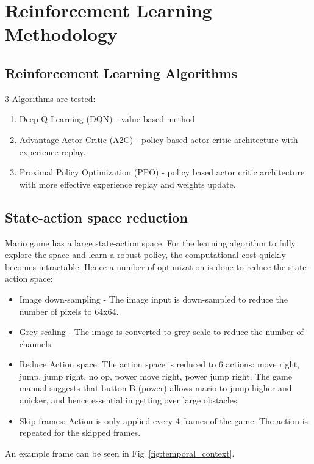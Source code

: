 \documentclass[conference]{IEEEtran}
\begin{document}
\section{Reinforcement Learning Methodology}

\subsection{Reinforcement Learning Algorithms}

3 Algorithms are tested:

\begin{enumerate}
    \item Deep Q-Learning (DQN) - value based method
    \item Advantage Actor Critic (A2C) - policy based actor critic architecture with experience replay.
    \item Proximal Policy Optimization (PPO) - policy based actor critic architecture with more effective experience replay and weights update.
\end{enumerate}

\subsection{State-action space reduction}

Mario game has a large state-action space. For the learning algorithm to fully explore the space and learn a robust policy, the computational cost quickly becomes intractable. Hence a number of optimization is done to reduce the state-action space:

\begin{itemize}
    \item Image down-sampling - The image input is down-sampled to reduce the number of pixels to 64x64.
    \item Grey scaling - The image is converted to grey scale to reduce the number of channels.
    \item Reduce Action space: The action space is reduced to 6 actions: move right, jump, jump right, no op, power move right, power jump right. The game manual suggests that button B (power) allows mario to jump higher and quicker, and hence essential in getting over large obstacles.
    \item Skip frames: Action is only applied every 4 frames of the game. The action is repeated for the skipped frames.
\end{itemize}

An example frame can be seen in Fig~\ref{fig:temporal_context}.
\end{document}
